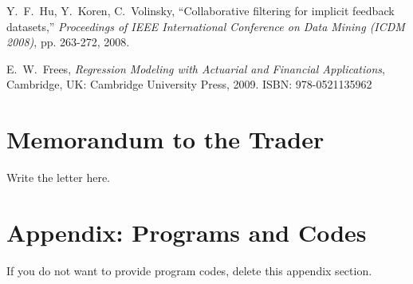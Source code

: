 \documentclass[12pt,a4paper]{article}
\begin{document}
\begin{spacing}{1.2}
\begin{thebibliography}{00}
Y.~F.~Hu, Y.~Koren, C.~Volinsky, ``Collaborative filtering for implicit feedback datasets,'' \textit{Proceedings of IEEE International Conference on Data Mining (ICDM 2008)}, pp. 263-272, 2008.

E.~W.~Frees, \textit{Regression Modeling with Actuarial and Financial Applications}, Cambridge, UK: Cambridge University Press, 2009. ISBN: 978-0521135962

\end{thebibliography}


\addtocounter{page}{-1}
\thispagestyle{empty}

\newpage
\addtocounter{page}{-1}
\thispagestyle{empty}

{\centering\section*{Memorandum to the Trader}}

Write the letter here.



\end{spacing}


\newpage
\appendix
\addtocounter{page}{-1}
\thispagestyle{empty}



\section*{Appendix: Programs and Codes}

If you do not want to provide program codes, delete this appendix section.
\\

\end{document}
